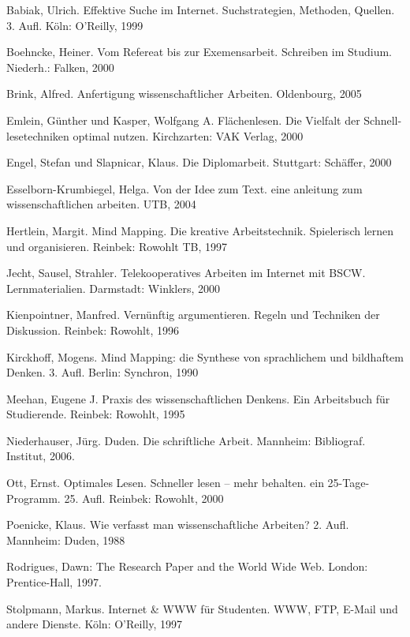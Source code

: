 \documentclass[]{book}
\theoremstyle{definition}
\theoremstyle{definition}
\theoremstyle{definition}
\theoremstyle{remark}
\begin{document}
Babiak, Ulrich. Effektive Suche im Internet. Suchstrategien, Methoden,
Quellen. 3. Aufl. Köln: O'Reilly, 1999

Boehncke, Heiner. Vom Refereat bis zur Exemensarbeit. Schreiben im
Studium. Niederh.: Falken, 2000

Brink, Alfred. Anfertigung wissenschaftlicher Arbeiten. Oldenbourg, 2005

Emlein, Günther und Kasper, Wolfgang A. Flächenlesen. Die Vielfalt der
Schnell-lesetechniken optimal nutzen. Kirchzarten: VAK Verlag, 2000

Engel, Stefan und Slapnicar, Klaus. Die Diplomarbeit. Stuttgart:
Schäffer, 2000

Esselborn-Krumbiegel, Helga. Von der Idee zum Text. eine anleitung zum
wissenschaftlichen arbeiten. UTB, 2004

Hertlein, Margit. Mind Mapping. Die kreative Arbeitstechnik. Spielerisch
lernen und organisieren. Reinbek: Rowohlt TB, 1997

Jecht, Sausel, Strahler. Telekooperatives Arbeiten im Internet mit BSCW.
Lernmaterialien. Darmstadt: Winklers, 2000

Kienpointner, Manfred. Vernünftig argumentieren. Regeln und Techniken
der Diskussion. Reinbek: Rowohlt, 1996

Kirckhoff, Mogens. Mind Mapping: die Synthese von sprachlichem und
bildhaftem Denken. 3. Aufl. Berlin: Synchron, 1990

Meehan, Eugene J. Praxis des wissenschaftlichen Denkens. Ein Arbeitsbuch
für Studierende. Reinbek: Rowohlt, 1995

Niederhauser, Jürg. Duden. Die schriftliche Arbeit. Mannheim:
Bibliograf. Institut, 2006.

Ott, Ernst. Optimales Lesen. Schneller lesen -- mehr behalten. ein
25-Tage-Programm. 25. Aufl. Reinbek: Rowohlt, 2000

Poenicke, Klaus. Wie verfasst man wissenschaftliche Arbeiten? 2. Aufl.
Mannheim: Duden, 1988

Rodrigues, Dawn: The Research Paper and the World Wide Web. London:
Prentice-Hall, 1997.

Stolpmann, Markus. Internet \& WWW für Studenten. WWW, FTP, E-Mail und
andere Dienste. Köln: O'Reilly, 1997


\end{document}
